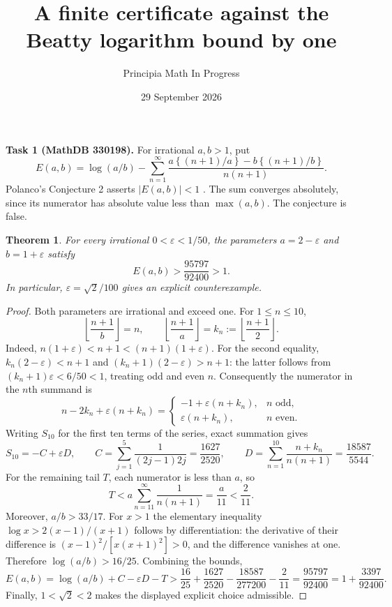 \documentclass[11pt]{article}
\title{A finite certificate against the Beatty logarithm bound by one}
\author{Principia Math In Progress}
\date{29 September 2026}
\newtheorem{theorem}{Theorem}
\newcommand{\fr}[1]{\left\{#1\right\}}
\begin{document}
\maketitle
\noindent\textbf{Task 1 (MathDB 330198).}
For irrational $a,b>1$, put
\[
 E(a,b)=\log(a/b)-\sum_{n=1}^{\infty}
 \frac{a\fr{(n+1)/a}-b\fr{(n+1)/b}}{n(n+1)}.
\]
Polanco's Conjecture 2 asserts $|E(a,b)|<1$ \cite{polanco}.
The sum converges absolutely, since its numerator has absolute value
less than $\max(a,b)$. The conjecture is false.

\begin{theorem}
For every irrational $0<\varepsilon<1/50$, the parameters
$a=2-\varepsilon$ and $b=1+\varepsilon$ satisfy
\[
 E(a,b)>\frac{95797}{92400}>1.
\]
In particular, $\varepsilon=\sqrt{2}/100$ gives an explicit counterexample.
\end{theorem}
\begin{proof}
Both parameters are irrational and exceed one. For $1\le n\le10$,
\[
 \left\lfloor\frac{n+1}{b}\right\rfloor=n,
 \qquad
 \left\lfloor\frac{n+1}{a}\right\rfloor
   =k_n:=\left\lfloor\frac{n+1}{2}\right\rfloor.
\]
Indeed, $n(1+\varepsilon)<n+1<(n+1)(1+\varepsilon)$.
For the second equality, $k_n(2-\varepsilon)<n+1$ and
$(k_n+1)(2-\varepsilon)>n+1$: the latter follows from
$(k_n+1)\varepsilon<6/50<1$, treating odd and even $n$.
Consequently the numerator in the $n$th summand is
\[
 n-2k_n+\varepsilon(n+k_n)=
 \begin{cases}-1+\varepsilon(n+k_n),&n\text{ odd},\\
 \varepsilon(n+k_n),&n\text{ even}.
 \end{cases}
\]
Writing $S_{10}$ for the first ten terms of the series, exact summation gives
\[
 S_{10}=-C+\varepsilon D,\qquad
 C=\sum_{j=1}^{5}\frac{1}{(2j-1)2j}=\frac{1627}{2520},\qquad
 D=\sum_{n=1}^{10}\frac{n+k_n}{n(n+1)}=\frac{18587}{5544}.
\]
For the remaining tail $T$, each numerator is less than $a$, so
\[
 T< a\sum_{n=11}^{\infty}\frac{1}{n(n+1)}
 =\frac{a}{11}<\frac{2}{11}.
\]
Moreover, $a/b>33/17$. For $x>1$ the elementary inequality
$\log x>2(x-1)/(x+1)$ follows by differentiation: the derivative
of their difference is $(x-1)^2/[x(x+1)^2]>0$, and the difference
vanishes at one. Therefore $\log(a/b)>16/25$. Combining the bounds,
\[
 E(a,b)=\log(a/b)+C-\varepsilon D-T
 >\frac{16}{25}+\frac{1627}{2520}
   -\frac{18587}{277200}-\frac{2}{11}
 =\frac{95797}{92400}=1+\frac{3397}{92400}.
\]
Finally, $1<\sqrt2<2$ makes the displayed explicit choice admissible.
\end{proof}
\end{document}
